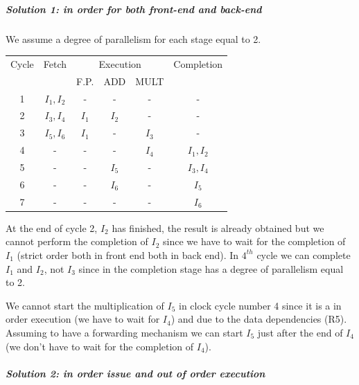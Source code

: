 \subparagraph{Solution 1: in order for both front-end and back-end}
We assume a degree of parallelism for each stage equal to 2.

\begin{center}
  \begin{tabular}{|c|c|c|c|c|c|}
    \hline
    Cycle&    Fetch       &\multicolumn{3}{|c|}{Execution}  &   Completion  \\
    &       &     F.P.  & ADD     & MULT  &               \\ \hline \hline
    1&    $I_1, I_2$&       -&    -&    -&        -\\
    2&    $I_3, I_4$&       $I_1$&  $I_2$&  -&        -\\
    3&    $I_5, I_6$&       $I_1$&  -&    $I_3$&      -\\
    4&      -&          -&    -&    $I_4$&      $I_1,I_2$\\
    5&      -&          -&    $I_5$&    -&      $I_3,I_4$\\
    6&      -&          -&    $I_6$&    -&      $I_5$\\
    7&      -&          -&    -&      -&      $I_6$\\
    \hline
  \end{tabular}
\end{center}

At the end of cycle 2, $I_2$ has finished, the result is already obtained but we cannot perform the completion of $I_2$ since we have to wait for the completion of $I_1$ (strict order both in front end both in back end). In $4^{th}$ cycle we can complete $I_1$ and $I_2$, not $I_3$ since in the completion stage has a degree of parallelism equal to 2.

We cannot start the multiplication of $I_5$ in clock cycle number 4 since it is a in order execution (we have to wait for $I_4$) and due to the data dependencies (R5). Assuming to have a forwarding mechanism we can start $I_5$ just after the end of $I_4$ (we don't have to wait for the completion of $I_4$).

\subparagraph{Solution 2: in order issue and out of order execution}

